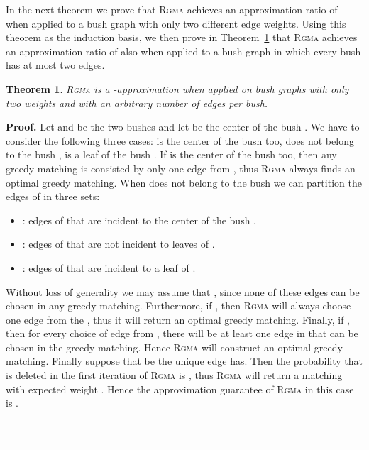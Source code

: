 \documentclass[a4paper,11pt]{article}
\newtheorem{theorem}{Theorem}
\newenvironment{proof}[1][Proof]{\noindent\textbf{#1.} }{\ \rule{0.5em}{0.5em}}
\newcommand{\rgma}{\textsc{Rgma}\xspace}
\begin{document}
\medskip


In the next theorem we prove that \rgma achieves an approximation ratio of  when 
applied to a bush graph with only two different edge weights. 
Using this theorem as the induction basis, we then prove in Theorem~\ref{thm:app2bush} that 
\rgma achieves an approximation ratio of  also when applied to a bush graph in which every bush has at most two edges.

\begin{theorem}
\label{thm:app2bush}
\rgma is a -approximation when applied on bush graphs with only two
weights and with an arbitrary number of edges per bush.
\end{theorem}

\begin{proof}
Let  and  be the two bushes and let  be the center of the bush 
. We have to consider the following three cases:  is the center of the 
bush  too,  does not belong to the bush ,  is a leaf of the 
bush . 
If  is the center of the bush  too, then any greedy matching is 
consisted by only one edge from , thus \rgma always finds an optimal greedy
matching. 
When  does not belong to the bush  we can partition the edges of 
in three sets: 
\begin{itemize}
\item : edges of  that are incident to the center of the bush .
\item : edges of  that are not incident to leaves of .
\item : edges of  that are incident to a leaf of .
\end{itemize}
Without loss of generality we may assume that , since none 
of these edges can be chosen in any greedy matching. Furthermore, if 
, then \rgma will always choose one edge from the ,
thus it will return an optimal greedy matching. Finally, if , then 
for every choice of edge from , there will be at least one edge in  
that can be chosen in the greedy matching. Hence \rgma will construct an optimal
greedy matching. Finally suppose that  be the unique edge 
has. Then the probability that  is deleted in the first iteration of \rgma
is , thus \rgma will return a matching with expected weight 
. Hence the 
approximation guarantee of \rgma in this case is 
. 


\end{proof}
\end{document}
